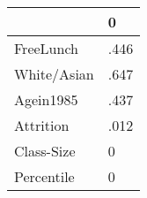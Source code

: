 \begin{table}[htbp]
\begin{tabular}{ll} \hline \hline
 & 0  \\  \hline 
FreeLunch & .446 \\  
White/Asian & .647 \\  
Agein1985 & .437 \\  
Attrition & .012 \\  
Class-Size & 0 \\  
Percentile & 0 \\  
\hline \hline \end{tabular}
\end{table}
